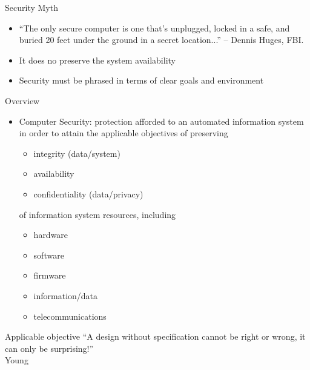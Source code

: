 \documentclass{beamer}
\begin{document}
\begin{frame}{Security Myth}
  
  \begin{itemize}
\item   ``The only secure computer is one that's unplugged, locked in a safe,
  and buried 20 feet under the ground in a secret location...'' --
  Dennis Huges, FBI.
\item<2-> It does no preserve the system availability
\item<2->Security must be phrased in terms of clear goals and
environment
  \end{itemize}
\end{frame}


\begin{frame}{Overview}
  \begin{itemize}
  \item \alert{Computer Security}: protection afforded to an 
    automated information system in order to attain 
    the \alert{applicable objectives} of preserving
    
    \begin{itemize}
    \item integrity (data/system)
    \item availability
    \item confidentiality (data/privacy)
    \end{itemize}
of  information system resources, including
 
\begin{itemize}
  \item hardware
  \item software
  \item firmware
  \item information/data
  \item telecommunications
\end{itemize}
  \end{itemize}
\end{frame}



\begin{frame}{Applicable objective}
``A design without specification cannot be right or wrong,
  it can only be surprising!''
  \\
  Young
\end{frame}
\end{document}

